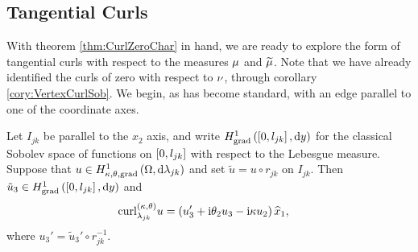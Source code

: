 \subsection{Tangential Curls} \label{ssec:TangCurls}
With theorem \ref{thm:CurlZeroChar} in hand, we are ready to explore the form of tangential curls with respect to the measures $\mu$ and $\widetilde{\mu}$.
Note that we have already identified the curls of zero with respect to $\nu$, through corollary \ref{cory:VertexCurlSob}.
We begin, as has become standard, with an edge parallel to one of the coordinate axes.
\begin{prop} \label{prop:TangCurlEdgeParallel}
	Let $I_{jk}$ be parallel to the $x_2$ axis, and write $H^1_\mathrm{grad}\left( \left[ 0,l_{jk} \right], \mathrm{d}y \right)$ for the classical Sobolev space of functions on $\left[ 0,l_{jk} \right]$ with respect to the Lebesgue measure.
	Suppose that $u\in H^1_{\kappa,\theta,\mathrm{grad}}\left( \Omega, \mathrm{d}\lambda_{jk} \right)$ and set $\tilde{u}=u\circ r_{jk}$ on $I_{jk}$.
	Then $\tilde{u}_3\in H^1_\mathrm{grad}\left( \left[ 0,l_{jk} \right], \mathrm{d}y \right)$ and 
	\begin{align*}
		\mathrm{curl}_{\lambda_{jk}}^{\left( \kappa, \theta \right)}u &= \left(  u_3' + \mathrm{i}\theta_2 u_3 - \mathrm{i}\kappa u_2  \right)\widehat{x}_1,
	\end{align*}
	where $u_3'=\tilde{u}_3'\circ r_{jk}^{-1}$.
\end{prop}

